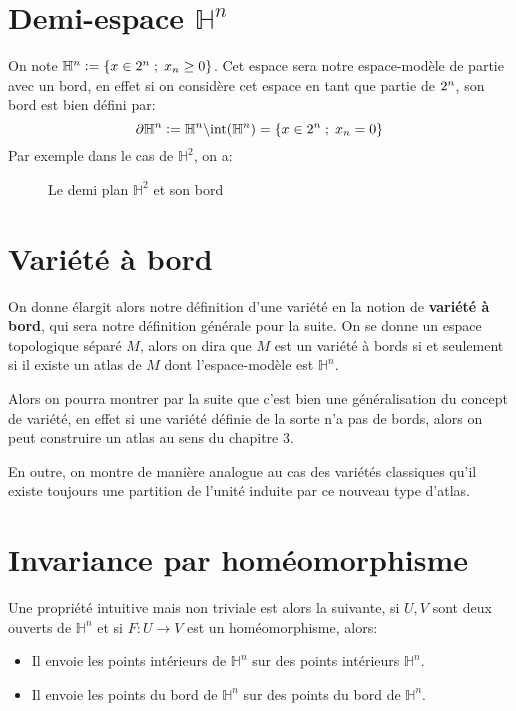    \section{Demi-espace \( \mathbb{H}^n \)}
   On note \( \mathbb{H}^n := \left\{ x \in 2^n  \; ; \; x_n \geq 0\right\} \). Cet espace sera notre espace-modèle de partie avec un bord, en effet si on considère cet espace en tant que partie de \( 2^n \), son bord est bien défini par:
   \[ 
      \partial\mathbb{H}^n := \mathbb{H}^n \backslash \text{int}(\mathbb{H}^n) = \left\{ x \in 2^n \; ; \; x_n = 0\right\}  
   \]
   Par exemple dans le cas de \( \mathbb{H}^2 \), on a:
      \begin{figure}[ht!]
         \centering
        \caption{Le demi plan \( \mathbb{H}^2 \) et son bord}
      \end{figure}
   \vspace{-15pt}
   \section{Variété à bord}
   On donne élargit alors notre définition d'une variété en la notion de \textbf{variété à bord}, qui sera notre définition générale pour la suite. On se donne un espace topologique séparé \( M \), alors on dira que \( M \) est un variété à bords si et seulement si il existe un atlas de \( M \) dont l'espace-modèle est \( \mathbb{H}^n \). \<
   
   Alors on pourra montrer par la suite que c'est bien une généralisation du concept de variété, en effet si une variété définie de la sorte n'a pas de bords, alors on peut construire un atlas au sens du chapitre 3.\<

   En outre, on montre de manière analogue au cas des variétés classiques qu'il existe toujours une partition de l'unité induite par ce nouveau type d'atlas.
   \pagebreak
   \section{Invariance par homéomorphisme}
   Une propriété intuitive mais non triviale est alors la suivante, si \(U, V\) sont deux ouverts de \(\mathbb{H}^n\) et si \(F : U \longrightarrow V\) est un homéomorphisme, alors:
   \begin{itemize}
      \item Il envoie les points intérieurs de \(\mathbb{H}^n\) sur des points intérieurs \(\mathbb{H}^n\).
      \item Il envoie les points du bord de \(\mathbb{H}^n\) sur des points du bord de \(\mathbb{H}^n\).
   \end{itemize}
